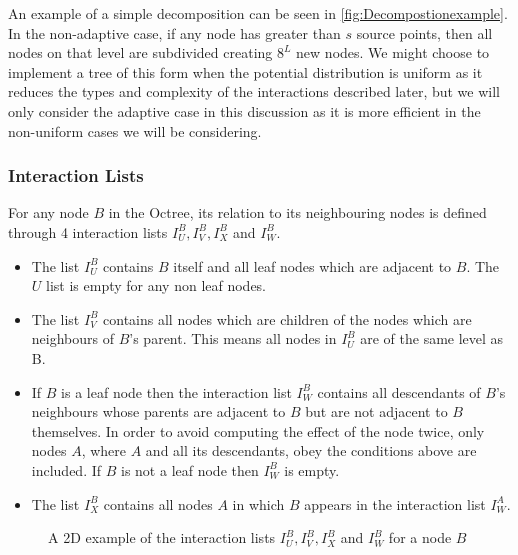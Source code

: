 An example of a simple decomposition can be seen in \cref{fig:Decompostionexample}. In the non-adaptive case, if any node has greater than $s$ source points, then all nodes on that level are subdivided creating $8^L$ new nodes. We might choose to implement a tree of this form when the potential distribution is uniform as it reduces the types and complexity of the interactions described later, but we will only consider the adaptive case in this discussion as it is more efficient in the non-uniform cases we will be considering.

\subsubsection{Interaction Lists}
For any node $B$ in the Octree, its relation to its neighbouring nodes is defined through 4 interaction lists $I_U^B, I_V^B, I_X^B$ and $I_W^B$.

\begin{itemize}
\item The list $I^B_U$ contains $B$ itself and all leaf nodes which are adjacent to $B$. The $U$ list is empty for any non leaf nodes.

\item The list $I_V^B$ contains all nodes which are children of the nodes which are neighbours of $B$'s parent. This means all nodes in $I_U^B$ are of the same level as B.

\item If $B$ is a leaf node then the interaction list $I_W^B$ contains all descendants of $B$'s neighbours whose parents are adjacent to $B$ but are not adjacent to $B$ themselves. In order to avoid computing the effect of the node twice, only nodes $A$, where $A$ and all its descendants, obey the conditions above are included. If $B$ is not a leaf node then $I_W^B$ is empty.

\item The list $I_X^B$ contains all nodes $A$ in which $B$ appears in the interaction list $I_W^A$.
\end{itemize}

\begin{figure}
    \centering
    \resizebox{.5\linewidth}{!}{}
    \caption{A 2D example of the interaction lists $I_U^B, I_V^B, I_X^B$ and $I_W^B$ for a node $B$}
    \label{fig:InteractionsLists}
\end{figure}


